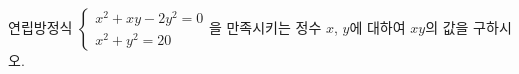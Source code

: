 연립방정식 $\begin{cases} x^2+xy-2y^2=0 \\ x^2+y^2=20 \end{cases}$을 만족시키는 정수 $x$, $y$에 대하여 $xy$의 값을 구하시오.
